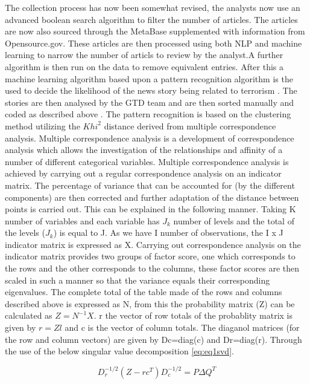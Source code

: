 The collection process has now been somewhat revised, the analysts now use an advanced boolean search algorithm to filter the number of articles. The articles are now also sourced through the MetaBase supplemented with information from Opensource.gov. These articles are then processed using both NLP and machine learning to narrow the number of articls to review by the analyst.A further algorithm is then run on the data to remove equivalent entries. After this a machine learning algorithm  based upon a pattern recognition algorithm is the used to decide the likelihood of the news story being related to terrorism \citep{fivethirtyeightGTD2015}. The stories are then analysed by the GTD team and are then sorted manually and coded as described above \citep{ben2016pattern}. The pattern recognition is based on the clustering method utilizing the ${Khi}^2$ distance derived from multiple correspondence analysis. Multiple correspondence analysis is a development of correspondence analysis which allows the investigation of the relationships and affinity of a number of different categorical variables. Multiple correspondence analysis is achieved by carrying out a regular correspondence analysis on an indicator matrix. The percentage of variance that can be accounted for (by the different components) are then corrected and further adaptation of the distance between points is carried out. This can be explained in the following manner. Taking K number of variables and each variable has $J_{k}$ number of levels and the total of the levels ($J_{k}$) is equal to J. As we have I number of  observations, the I x J indicator matrix is expressed as X. Carrying out correspondence analysis on the indicator matrix provides two groups of factor score, one which corresponds to the rows and the other corresponds to the columns, these factor scores are then scaled in such a manner so that the variance equals their corresponding eigenvalues. The complete total of the table made of the rows and columns described above is expressed as N, from this the probability matrix (Z) can be calculated as  $Z = N^{-1}X$. r the vector of row totals of the probablity matrix is given by $r=Zl$ and c is the vector of column totals. The diaganol  matrices (for the row and column vectors) are given by Dc=diag(c) and Dr=diag(r). Through the use of the below singular value decomposition \ref{eq:eq1svd}. 

\begin{equation} D_{r}^{-1/2}(Z-rc^{T})D_{c}^{-1/2}=P\Delta Q^{T}  \label{eq:eq1svd} \end{equation}

